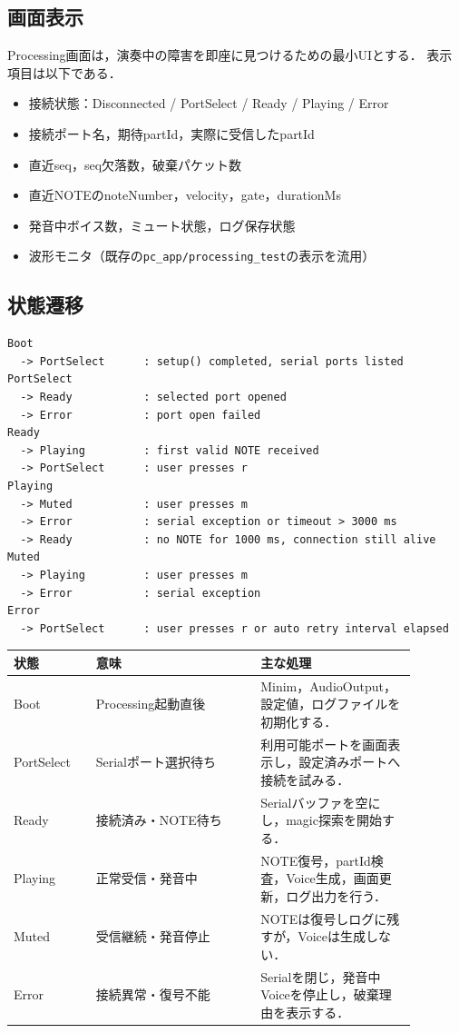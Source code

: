 \documentclass[a4paper,11pt]{jsarticle}
\begin{document}
\subsection{画面表示}

Processing画面は，演奏中の障害を即座に見つけるための最小UIとする．
表示項目は以下である．

\begin{itemize}
\item 接続状態：Disconnected / PortSelect / Ready / Playing / Error
\item 接続ポート名，期待partId，実際に受信したpartId
\item 直近seq，seq欠落数，破棄パケット数
\item 直近NOTEのnoteNumber，velocity，gate，durationMs
\item 発音中ボイス数，ミュート状態，ログ保存状態
\item 波形モニタ（既存の\texttt{pc\_app/processing\_test}の表示を流用）
\end{itemize}

\subsection{状態遷移}

\begin{lstlisting}[style=textdiagram, caption={Processing音源サブシステムの状態遷移}]
Boot
  -> PortSelect      : setup() completed, serial ports listed
PortSelect
  -> Ready           : selected port opened
  -> Error           : port open failed
Ready
  -> Playing         : first valid NOTE received
  -> PortSelect      : user presses r
Playing
  -> Muted           : user presses m
  -> Error           : serial exception or timeout > 3000 ms
  -> Ready           : no NOTE for 1000 ms, connection still alive
Muted
  -> Playing         : user presses m
  -> Error           : serial exception
Error
  -> PortSelect      : user presses r or auto retry interval elapsed
\end{lstlisting}

\begin{longtable}{p{0.18\linewidth}p{0.36\linewidth}p{0.34\linewidth}}
\hline
状態 & 意味 & 主な処理 \\
\hline
\endhead
Boot & Processing起動直後 & Minim，AudioOutput，設定値，ログファイルを初期化する． \\
\hline
PortSelect & Serialポート選択待ち & 利用可能ポートを画面表示し，設定済みポートへ接続を試みる． \\
\hline
Ready & 接続済み・NOTE待ち & Serialバッファを空にし，magic探索を開始する． \\
\hline
Playing & 正常受信・発音中 & NOTE復号，partId検査，Voice生成，画面更新，ログ出力を行う． \\
\hline
Muted & 受信継続・発音停止 & NOTEは復号しログに残すが，Voiceは生成しない． \\
\hline
Error & 接続異常・復号不能 & Serialを閉じ，発音中Voiceを停止し，破棄理由を表示する． \\
\hline
\end{longtable}
\end{document}
